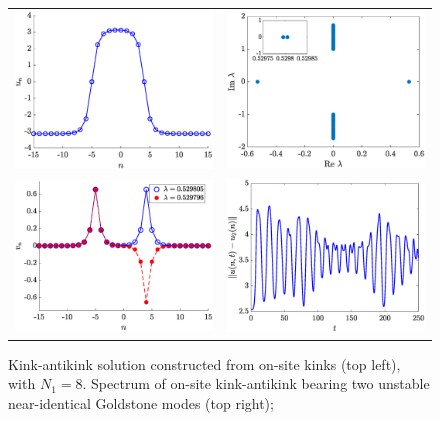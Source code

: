\documentclass[12pt,reqno]{amsart}
\begin{document}
\begin{figure}[H]
	\begin{center}
	\begin{tabular}{cc}
	\includegraphics[width=6cm]{unstablekak.eps} &
	\includegraphics[width=6cm]{unstablekakspec.eps} \\
	\includegraphics[width=6cm]{unstablekakgoldstone.eps} &
	\includegraphics[width=6cm]{unstablekakpertnorm.eps}
	\end{tabular}
	\end{center}
	\caption{Kink-antikink solution constructed from on-site kinks (top left), with $N_1 = 8$. Spectrum of on-site kink-antikink bearing two unstable near-identical Goldstone modes (top right);
}
\end{figure}
\end{document}
